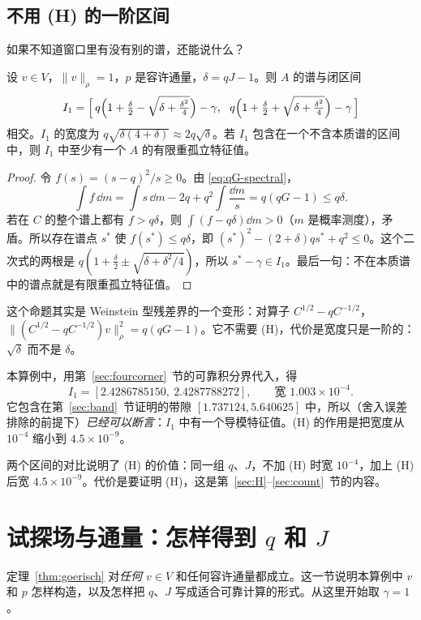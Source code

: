 \documentclass[11pt,a4paper,fontset=fandol]{ctexart}
\begin{document}
\subsection{不用 (H) 的一阶区间}

如果不知道窗口里有没有别的谱，还能说什么？

\begin{proposition}[一阶区间]
\label{prop:first-order}
设 $v\in V$，$\|v\|_\rho=1$，$p$ 是容许通量，$\delta=qJ-1$。则 $A$ 的谱与闭区间
\[
I_1=\Bigl[\,q\Bigl(1+\tfrac\delta2-\sqrt{\delta+\tfrac{\delta^2}4}\Bigr)-\gamma,\ \ q\Bigl(1+\tfrac\delta2+\sqrt{\delta+\tfrac{\delta^2}4}\Bigr)-\gamma\,\Bigr]
\]
相交。$I_1$ 的宽度为 $q\sqrt{\delta(4+\delta)}\approx2q\sqrt\delta$。若 $I_1$ 包含在一个不含本质谱的区间中，则 $I_1$ 中至少有一个 $A$ 的有限重孤立特征值。
\end{proposition}

\begin{proof}
令 $f(s)=(s-q)^2/s\ge0$。由 \eqref{eq:qG-spectral}，
\[
\int f\,\dd m=\int s\,\dd m-2q+q^2\int\frac{\dd m}{s}=q(qG-1)\le q\delta .
\]
若在 $C$ 的整个谱上都有 $f>q\delta$，则 $\int(f-q\delta)\dd m>0$（$m$ 是概率测度），矛盾。所以存在谱点 $s^*$ 使 $f(s^*)\le q\delta$，即 $(s^*)^2-(2+\delta)qs^*+q^2\le0$。这个二次式的两根是 $q(1+\tfrac\delta2\pm\sqrt{\delta+\delta^2/4})$，所以 $s^*-\gamma\in I_1$。最后一句：不在本质谱中的谱点就是有限重孤立特征值。
\end{proof}

这个命题其实是 Weinstein 型残差界的一个变形：对算子 $C^{1/2}-qC^{-1/2}$，$\|(C^{1/2}-qC^{-1/2})v\|_\rho^2=q(qG-1)$。它不需要 (H)，代价是宽度只是一阶的：$\sqrt\delta$ 而不是 $\delta$。

本算例中，用第~\ref{sec:fourcorner}~节的可靠积分界代入，得
\[
I_1=[2.4286785150,\ 2.4287788272],\qquad\text{宽 }1.003\times10^{-4} .
\]
它包含在第~\ref{sec:band}~节证明的带隙 $[1.737124,5.640625]$ 中，所以（舍入误差排除的前提下）\emph{已经可以断言}：$I_1$ 中有一个导模特征值。(H) 的作用是把宽度从 $10^{-4}$ 缩小到 $4.5\times10^{-9}$。

\begin{keypoint}
两个区间的对比说明了 (H) 的价值：同一组 $q$、$J$，不加 (H) 时宽 $10^{-4}$，加上 (H) 后宽 $4.5\times10^{-9}$。代价是要证明 (H)，这是第~\ref{sec:H}--\ref{sec:count}~节的内容。
\end{keypoint}

\section{试探场与通量：怎样得到 $q$ 和 $J$}
\label{sec:trial}
定理~\ref{thm:goerisch} 对\emph{任何} $v\in V$ 和任何容许通量都成立。这一节说明本算例中 $v$ 和 $p$ 怎样构造，以及怎样把 $q$、$J$ 写成适合可靠计算的形式。从这里开始取 $\gamma=1$。
\end{document}
